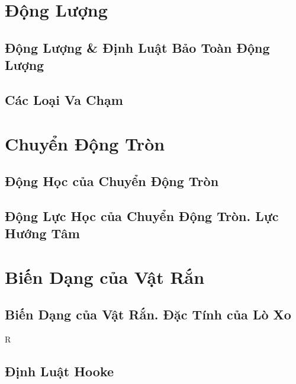 \documentclass[oneside]{book}
\numberwithin{equation}{section}
\begin{document}
\chapter{Động Lượng}

\section{Động Lượng \& Định Luật Bảo Toàn Động Lượng}


\section{Các Loại Va Chạm}


\chapter{Chuyển Động Tròn}

\section{Động Học của Chuyển Động Tròn}


\section{Động Lực Học của Chuyển Động Tròn. Lực Hướng Tâm}


\chapter{Biến Dạng của Vật Rắn}

\section{Biến Dạng của Vật Rắn. Đặc Tính của Lò Xo}

R
\section{Định Luật Hooke}


\printbibliography[heading=bibintoc]
	
\end{document}
